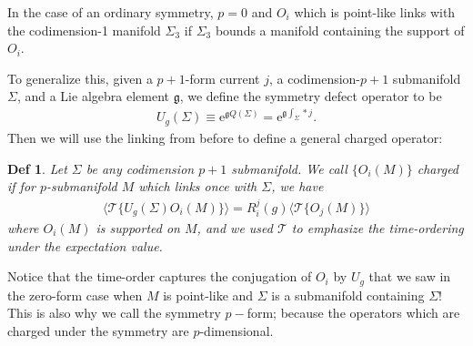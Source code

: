 \documentclass[11pt]{article}
\newtheorem{defn}{Def}
\newcommand{\e}{\mathrm{e}}
\begin{document}
In the case of an ordinary symmetry, $p = 0$ and $O_i$ which is point-like links
with the codimension-1 manifold $\Sigma_3$ if $\Sigma_3$ bounds a manifold
containing the support of $O_i$.

To generalize this, given a $p+1$-form current $j$, a codimension-$p+1$
submanifold $\Sigma$, and a Lie algebra element $\mathfrak g$, we define the
symmetry defect operator to be
\begin{align}
  U_g(\Sigma) \equiv \e^{\mathfrak g Q(\Sigma)} = \e^{\mathfrak g \int_{\Sigma}*j}.
\end{align}
Then we will use the linking from before to define a general charged operator:
\begin{defn}
  Let $\Sigma$ be any codimension $p+1$ submanifold. We call $\{O_i(M)\}$
  charged if for $p$-submanifold $M$ which links once with $\Sigma$, we have
  \begin{align}
    \langle \mathcal T\{U_g(\Sigma)O_i(M)\}\rangle = R_i^j(g)\langle \mathcal T\{O_j(M)\}\rangle
  \end{align}
  where $O_i(M)$ is supported on $M$, and we used $\mathcal T$ to emphasize the
  time-ordering under the expectation value.
\end{defn}
Notice that the time-order captures the conjugation of $O_i$ by $U_g$ that we
saw in the zero-form case when $M$ is point-like and $\Sigma$ is a submanifold
containing $\Sigma$! This is also why we call the symmetry $p-$form; because the
operators which are charged under the symmetry are $p$-dimensional.
\end{document}
